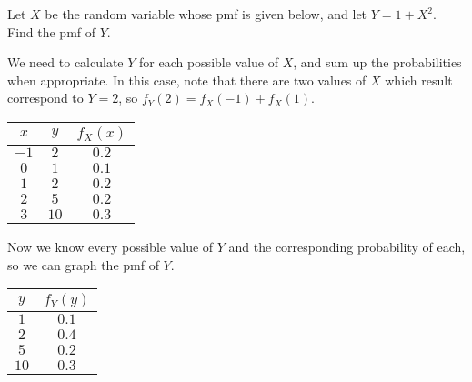 \begin{examp}\label{FunctionRVEx}
Let $X$ be the random variable whose pmf is given below, and let $Y = 1 + X^2$. Find the pmf of $Y$.
\begin{center}
\end{center}
\par
\noindent We need to calculate $Y$ for each possible value of $X$, and sum up the probabilities when appropriate. In this case, note that there are two values of $X$ which result correspond to $Y = 2$, so $f_{Y}(2) = f_X(-1) + f_X(1)$.
\begin{center}
\begin{tabular}{cc|c}
$x$ & $y$ & $f_X(x)$ \\
\hline
$-1$ & $2$ & $0.2$ \\
$0$ & $1$ & $0.1$ \\
$1$ & $2$ & $0.2$ \\
$2$ & $5$ & $0.2$ \\
$3$ & $10$ & $0.3$
\end{tabular}
\end{center}
Now we know every possible value of $Y$ and the corresponding probability of each, so we can graph the pmf of $Y$.
\begin{center}
\begin{minipage}{0.4\textwidth}
\centering
\begin{tabular}{c|c}
$y$ & $f_Y(y)$ \\
\hline
$1$ & $0.1$ \\
$2$ & $0.4$ \\
$5$ & $0.2$ \\
$10$ & $0.3$
\end{tabular}
\end{minipage}\begin{minipage}{0.6\textwidth}
\centering
{}
\end{minipage}
\end{center}
\end{examp}


